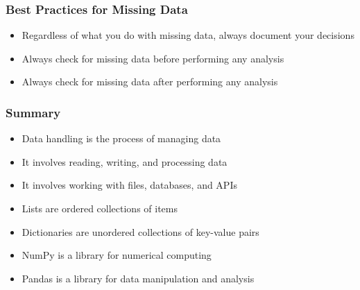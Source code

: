 \documentclass[serif, 9pt, aspectratio=32]{beamer}
\begin{document}
\begin{frame}
    \centering
    \frametitle{Best Practices for Missing Data}
    \begin{itemize}
        \setlength{\itemsep}{2em}
        \item Regardless of what you do with missing data, always document your decisions
        \item Always check for missing data before performing any analysis
        \item Always check for missing data after performing any analysis
    \end{itemize}
\end{frame}

\begin{frame}
    \centering
    \frametitle{Summary}
    \begin{itemize}
        \setlength{\itemsep}{2em}
        \item Data handling is the process of managing data
        \item It involves reading, writing, and processing data
        \item It involves working with files, databases, and APIs
        \item Lists are ordered collections of items
        \item Dictionaries are unordered collections of key-value pairs
        \item NumPy is a library for numerical computing
        \item Pandas is a library for data manipulation and analysis
    \end{itemize}
\end{frame}
\end{document}
